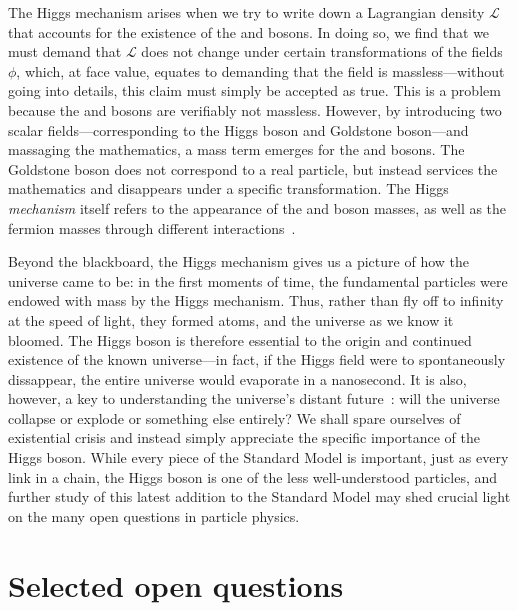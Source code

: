 The Higgs mechanism arises when we try to write down a Lagrangian density $\mathcal{L}$ that accounts for the existence of the \PW and \PZ bosons. 
In doing so, we find that we must demand that $\mathcal{L}$ does not change under certain transformations of the fields $\phi$, which, at face value, equates to demanding that the field is massless---without going into details, this claim must simply be accepted as true. 
This is a problem because the \PW and \PZ bosons are verifiably not massless. 
However, by introducing two scalar fields---corresponding to the Higgs boson and Goldstone boson---and massaging the mathematics, a mass term emerges for the \PW and \PZ bosons. 
The Goldstone boson does not correspond to a real particle, but instead services the mathematics\footnotemark{} and disappears under a specific transformation. 
The Higgs \textit{mechanism} itself refers to the appearance of the \PW and \PZ boson masses, as well as the fermion masses through different interactions~\cite{Weinberg:1967tq, Nambu:1961fr}. 

Beyond the blackboard, the Higgs mechanism gives us a picture of how the universe came to be: in the first moments of time, the fundamental particles were endowed with mass by the Higgs mechanism. 
Thus, rather than fly off to infinity at the speed of light, they formed atoms, and the universe as we know it bloomed.  
The Higgs boson is therefore essential to the origin and continued existence of the known universe---in fact, if the Higgs field were to spontaneously dissappear, the entire universe would evaporate in a nanosecond. %
It is also, however, a key to understanding the universe's distant future~\cite{Bass2021}: will the universe collapse or explode or something else entirely? %
We shall spare ourselves of existential crisis and instead simply appreciate the specific importance of the Higgs boson. 
While every piece of the Standard Model is important, just as every link in a chain, the Higgs boson is one of the less well-understood particles, and further study of this latest addition to the Standard Model may shed crucial light on the many open questions in particle physics. 

\section{Selected open questions}\label{sec:open_questions}
